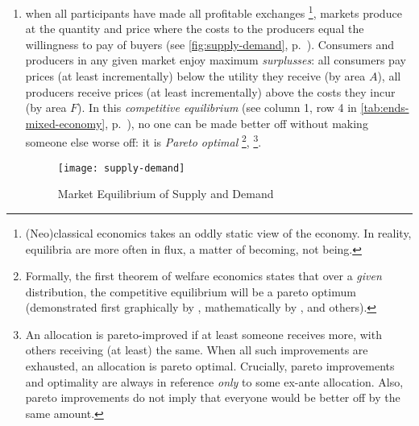 \begin{enumerate}
	\item 
		when all  participants have made all profitable exchanges
		\footnote{
			(Neo)classical economics takes an oddly static view of the economy. 
			In reality, equilibria are more often in flux, a matter of becoming, not being.
		}, 
		markets produce at the quantity and price where the costs to the producers equal the willingness to pay of buyers (see \autoref{fig:supply-demand}, p.~\pageref{fig:supply-demand}). 
		Consumers and producers in any given market enjoy maximum \emph{surplusses}: all consumers pay prices (at least incrementally) below the utility they receive (by area $A$), all producers receive prices (at least incrementally) above the costs they incur (by area $F$). 
		In this \emph{competitive equilibrium} (see column 1, row 4 in \autoref{tab:ends-mixed-economy}, p.~\pageref{tab:ends-mixed-economy}), no one can be made better off without making someone else worse off: it is \emph{Pareto optimal}
		\footnote{\label{fn:1st-theorem} 
			Formally, the first theorem of welfare economics states that over a \emph{given} distribution, the competitive equilibrium will be a pareto optimum (demonstrated first graphically by \cite{Lerner1944}, mathematically by \cite{Lange1934}, \cite{Debreu1954} and others).
		},
		\footnote{
			An allocation is pareto-improved if at least someone receives more, with others receiving (at least) the same. 
			When all such improvements are exhausted, an allocation is pareto optimal. 
			Crucially, pareto improvements and optimality are always in reference \emph{only} to some ex-ante allocation. 
			Also, pareto improvements do not imply that everyone would be better off by the same amount.}.
			
	\begin{figure}[htbp]
		\centering
		\texttt{[image: supply-demand]}  
		\caption{Market Equilibrium of Supply and Demand}
		\label{fig:supply-demand}
	\end{figure}
	

\end{enumerate}
